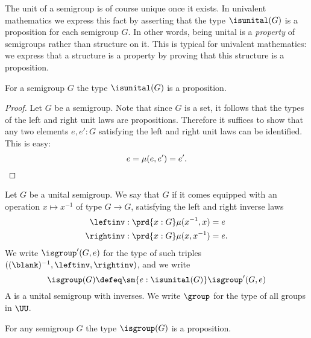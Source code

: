 The unit of a semigroup is of course unique once it exists. In univalent mathematics we express this fact by asserting that the type $\isunital(G)$ is a proposition for each semigroup $G$. In other words, being unital is a \emph{property} of semigroups rather than structure on it. This is typical for univalent mathematics: we express that a structure is a property by proving that this structure is a proposition.

\begin{lem}
  For a semigroup $G$ the type $\isunital(G)$ is a proposition.
\end{lem}

\begin{proof}
  Let $G$ be a semigroup. Note that since $G$ is a set, it follows that the types of the left and right unit laws are propositions. Therefore it suffices to show that any two elements $e,e':G$ satisfying the left and right unit laws can be identified. This is easy:
  \begin{equation*}
    e = \mu(e,e') = e'.\qedhere
  \end{equation*}
\end{proof}

\begin{defn}
  Let $G$ be a unital semigroup. We say that $G$  if it comes equipped with an operation $x\mapsto x^{-1}$ of type $G\to G$, satisfying the left and right inverse laws
  \begin{align*}
    \leftinv & : \prd{x:G}\mu(x^{-1},x)=e \\
    \rightinv & : \prd{x:G}\mu(x,x^{-1}) = e.
  \end{align*}
  We write $\isgroup'(G,e)$ for the type of such triples $((\blank)^{-1},\leftinv,\rightinv)$, and we write
  \begin{equation*}
    \isgroup(G)\defeq\sm{e:\isunital(G)}\isgroup'(G,e)
  \end{equation*}
  A  is a unital semigroup with inverses. We write $\group$ for the type of all groups in $\UU$.
\end{defn}

\begin{lem}
  For any semigroup $G$ the type $\isgroup(G)$ is a proposition.
\end{lem}

